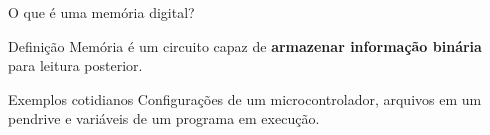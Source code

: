 \begin{frame}[t]{O que é uma memória digital?}
  \begin{block}{Definição}
    Memória é um circuito capaz de \textbf{armazenar informação binária} para leitura posterior.
  \end{block}
  \begin{center}
  \end{center}
  \begin{exampleblock}{Exemplos cotidianos}
    Configurações de um microcontrolador, arquivos em um pendrive e variáveis de um programa em execução.
  \end{exampleblock}
\end{frame}
